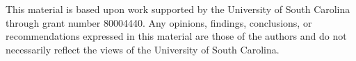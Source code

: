 \documentclass[]{spie}  %
\begin{document}
	\acknowledgments %
	
	This material is based upon work supported by the University of South Carolina through grant number 80004440. Any opinions, findings, conclusions, or recommendations expressed in this material are those of the authors and do not necessarily reflect the views of the University of South Carolina.


	
\end{document}
